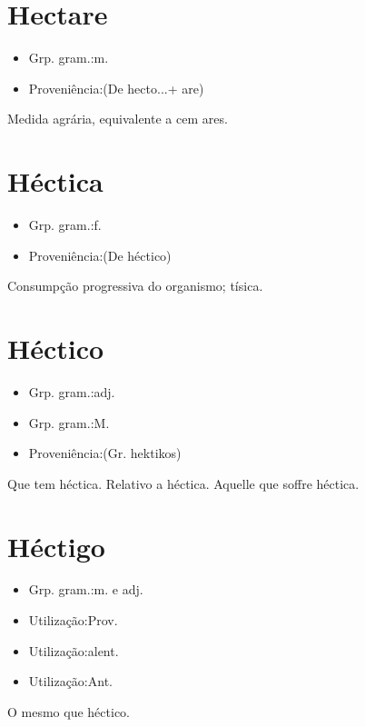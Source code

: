 \documentclass{article}
\begin{document}
\section{Hectare}
\begin{itemize}
\item {Grp. gram.:m.}
\end{itemize}
\begin{itemize}
\item {Proveniência:(De \textunderscore hecto...\textunderscore  + \textunderscore are\textunderscore )}
\end{itemize}
Medida agrária, equivalente a cem ares.
\section{Héctica}
\begin{itemize}
\item {Grp. gram.:f.}
\end{itemize}
\begin{itemize}
\item {Proveniência:(De \textunderscore héctico\textunderscore )}
\end{itemize}
Consumpção progressiva do organismo; tísica.
\section{Héctico}
\begin{itemize}
\item {Grp. gram.:adj.}
\end{itemize}
\begin{itemize}
\item {Grp. gram.:M.}
\end{itemize}
\begin{itemize}
\item {Proveniência:(Gr. \textunderscore hektikos\textunderscore )}
\end{itemize}
Que tem héctica.
Relativo a héctica.
Aquelle que soffre héctica.
\section{Héctigo}
\begin{itemize}
\item {Grp. gram.:m.  e  adj.}
\end{itemize}
\begin{itemize}
\item {Utilização:Prov.}
\end{itemize}
\begin{itemize}
\item {Utilização:alent.}
\end{itemize}
\begin{itemize}
\item {Utilização:Ant.}
\end{itemize}
O mesmo que \textunderscore héctico\textunderscore .
\end{document}
